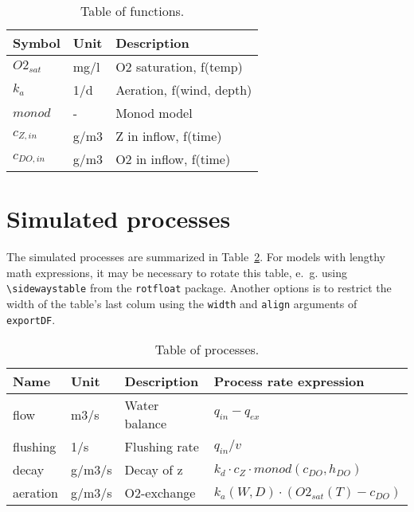 \documentclass[a4paper,10pt]{article}
\begin{document}
\begin{table}[!h]
  \caption{Table of functions. \label{tab:funs}}
  \begin{center}
  \begin{tabular}{lll}\hline
    \textbf{Symbol} & \textbf{Unit} & \textbf{Description} \\ \hline
    $O2_{sat}$ & mg/l & O2 saturation, f(temp) \\
    $k_a$ & 1/d & Aeration, f(wind, depth) \\
    $monod$ & - & Monod model \\
    $c_{Z,in}$ & g/m3 & Z in inflow, f(time) \\
    $c_{DO,in}$ & g/m3 & O2 in inflow, f(time) \\ \hline
  \end{tabular}  \end{center}
\end{table}


\section{Simulated processes}

The simulated processes are summarized in Table~\ref{tab:pros}. For models with lengthy math expressions, it may be necessary to rotate this table, e.~g. using \texttt{\textbackslash sidewaystable} from the \texttt{rotfloat} package. Another options is to restrict the width of the table's last colum using the \texttt{width} and \texttt{align} arguments of \texttt{exportDF}.

\begin{table}[!h]
  \caption{Table of processes. \label{tab:pros}}
  \begin{center}
  \begin{tabular}{llll}\hline
    \textbf{Name} & \textbf{Unit} & \textbf{Description} & \textbf{Process rate expression} \\ \hline
    flow & m3/s & Water balance & $q_{in} - q_{ex}$ \\
    flushing & 1/s & Flushing rate & $q_{in} / v$ \\
    decay & g/m3/s & Decay of z & $k_d \cdot  c_Z \cdot  monod(c_{DO}, h_{DO})$ \\
    aeration & g/m3/s & O2-exchange & $k_a(W,D) \cdot  (O2_{sat}(T) - c_{DO})$ \\ \hline
  \end{tabular}  \end{center}
\end{table}
\end{document}
